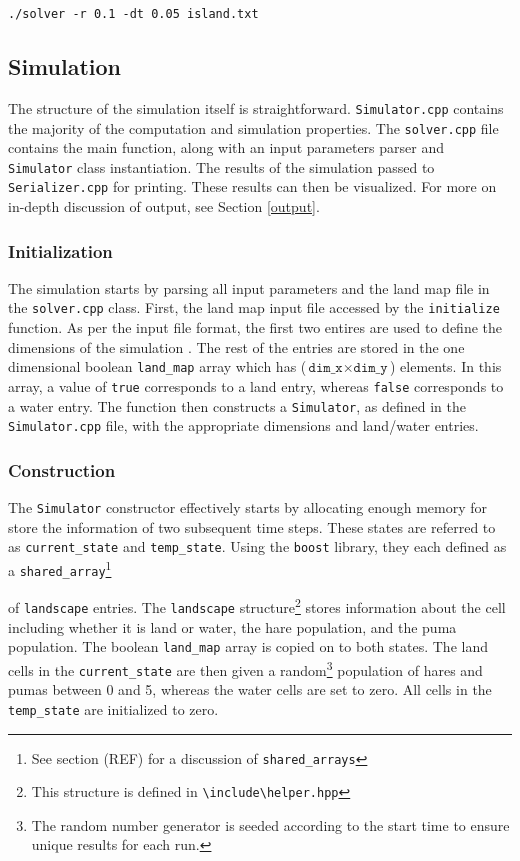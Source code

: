 \documentclass[a4paper,11pt]{article}
\begin{document}
{\vspace{5pt}
\noindent\texttt{./solver -r 0.1 -dt 0.05 island.txt}

\subsection{Simulation}

The structure of the simulation itself is straightforward.  \texttt{Simulator.cpp} contains the majority of the computation and simulation properties.  The \texttt{solver.cpp} file contains the main function, along with an input parameters parser and \texttt{Simulator} class instantiation.  The results of the simulation passed to \texttt{Serializer.cpp} for printing.  These results can then be visualized.  For more on in-depth discussion of output, see Section \ref{output}.

\subsubsection{Initialization}

The simulation starts by parsing all input parameters and the land map file in the \texttt{solver.cpp} class.  First, the land map input file accessed by the \texttt{initialize} function.  As per the input file format, the first two entires are used to define the dimensions of the simulation .  The rest of the entries are stored in the one dimensional boolean \texttt{land\_map} array which has ($\texttt{dim\_x} \times \texttt{dim\_y}$) elements.  In this array, a value of \texttt{true} corresponds to a land entry, whereas \texttt{false} corresponds to a water entry.  The function then constructs a \texttt{Simulator}, as defined in the \texttt{Simulator.cpp} file, with the appropriate dimensions and land/water entries.  

\subsubsection{Construction}

The \texttt{Simulator} constructor effectively starts by allocating enough memory for store the information of two subsequent time steps.  These states are  referred to as \texttt{current\_state} and \texttt{temp\_state}.  Using the \texttt{boost} library, they each defined as a \texttt{shared\_array}\footnote{See section (REF) for a discussion of \texttt{shared\_arrays}}} of \texttt{landscape} entries.  The \texttt{landscape} structure\footnote{This structure is defined in \texttt{\textbackslash include\textbackslash helper.hpp}} stores information about the cell including whether it is land or water, the hare population, and the puma population. The boolean \texttt{land\_map} array is copied on to both states.  The land cells in the \texttt{current\_state} are then given a random\footnote{The random number generator is seeded according to the start time to ensure unique results for each run.} population of hares and pumas between 0 and 5, whereas the water cells are set to zero.  All cells in the \texttt{temp\_state} are initialized to zero.
\end{document}
